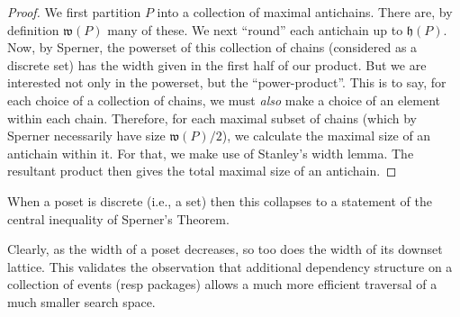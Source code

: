 \documentclass[hoptionsi,review,screen,format=acmsmall]{acmart}
\newtheorem{lemma}[theorem]{Lemma}
\theoremstyle{definition}
\newcommand{\Wf}{\mathfrak{w}}
\newcommand{\Hf}{\mathfrak{h}}
\begin{document}
\begin{proof} 
We first partition \(P\) into a collection of maximal antichains. There are, by definition \(\Wf(P)\) many of these. We next ``round'' each antichain up to \(\Hf(P)\). Now, by Sperner, the powerset of this collection of chains (considered as a discrete set) has the width given in the first half of our product. But we are interested not only in the powerset, but the ``power-product''. This is to say, for each choice of a collection of chains, we must \textit{also} make a choice of an element within each chain. Therefore, for each maximal subset of chains (which by Sperner necessarily have size \(\Wf(P)/2\)), we calculate the maximal size of an antichain within it. For that, we make use of Stanley's width lemma. The resultant product then gives the total maximal size of an antichain.
\end{proof}

When a poset is discrete (i.e., a set) then this collapses to a statement of the central inequality of Sperner's Theorem.

Clearly, as the width of a poset decreases, so too does the width of its downset lattice. This validates the observation that additional dependency structure on a collection of events (resp packages) allows a much more efficient traversal of a much smaller search space.










\end{document}

